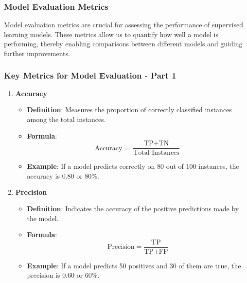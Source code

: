 \documentclass[aspectratio=169]{beamer}
\begin{document}
\begin{frame}[fragile]
    \frametitle{Model Evaluation Metrics}
    Model evaluation metrics are crucial for assessing the performance of supervised learning models. These metrics allow us to quantify how well a model is performing, thereby enabling comparisons between different models and guiding further improvements.
\end{frame}

\begin{frame}[fragile]
    \frametitle{Key Metrics for Model Evaluation - Part 1}
    \begin{enumerate}
        \item \textbf{Accuracy}
            \begin{itemize}
                \item \textbf{Definition}: Measures the proportion of correctly classified instances among the total instances.
                \item \textbf{Formula}:
                    \[
                    \text{Accuracy} = \frac{\text{TP} + \text{TN}}{\text{Total Instances}}
                    \]
                \item \textbf{Example}: If a model predicts correctly on 80 out of 100 instances, the accuracy is \(0.80\) or \(80\%\).
            \end{itemize}
        
        \item \textbf{Precision}
            \begin{itemize}
                \item \textbf{Definition}: Indicates the accuracy of the positive predictions made by the model.
                \item \textbf{Formula}:
                    \[
                    \text{Precision} = \frac{\text{TP}}{\text{TP} + \text{FP}}
                    \]
                \item \textbf{Example}: If a model predicts 50 positives and 30 of them are true, the precision is \(0.60\) or \(60\%\).
            \end{itemize}
    \end{enumerate}
\end{frame}
\end{document}
